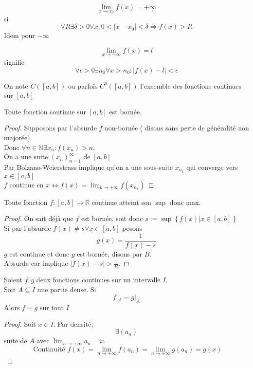 \documentclass[../main.tex]{subfiles}
\begin{document}
\begin{defn}[Notation]
	\[ 
		\lim_{x \to x_0} f(x) = + \infty
	\]
	si
	\[ 
		\forall R \exists \delta >0 \forall x : 0 <|x-x_0| < \delta \Rightarrow f(x) >R	
	\]
	Idem pour $- \infty$

\end{defn}

\begin{defn}[Notation]
\[ 
	\lim_{x \to  + \infty} f(x) = l
\]
signifie
\[ 
	\forall \epsilon>0 \exists n_0 \forall x >n_0: |f(x)-l| < \epsilon
\]

\end{defn}
On note $C( [ a,b])$ ou parfois $C^{0}( [ a,b])$ l'ensemble des fonctions continues sur $[a,b]$

\begin{thm}
	Toute fonction continue sur $[a,b]$ est bornée.
\end{thm}
\begin{proof}
	Supposons par l'absurde $f$ non-bornée ( disons sans perte de généralité non majorée). \\
	Donc $\forall n \in \mathbb{N} \exists x_n: f(x_n) >n$.\\
	On a une suite $(x_n)_{n=1} ^{ \infty}$ de $[a,b]$\\
	Par Bolzano-Weierstrass implique qu'on a une sous-suite  $x_{n_k}$ qui converge vers $x\in [ a,b]$ \\
	$f$ continue en $x \iff f(x) = \lim_{k \to  + \infty} f(x_{ n_k })$
\end{proof}
\begin{thm}
Toute fonction $f: [ a,b] \to \mathbb{R}$ continue atteint son $\sup$ donc max.
\end{thm}
\begin{proof}
	On sait déjà que $f$ est bornée, soit donc $s:= \sup \left\{ f(x) | x\in [ a,b] \right\} $ \\
	Si par l'absurde $f(x) \neq s \forall x \in [ a,b]$ posons
	\[ 
		g(x) = \frac{1}{f(x) -s}
	\]
	$g$ est continue et donc $g$ est bornée, disons par $B$.\\
	Absurde car implique $|f(x)-s| > \frac{1}{B}$.
\end{proof}

\begin{propo}
Soient $f,g$ deux fonctions continues sur un intervalle $I$.\\
Soit $A\subseteq I$ une partie dense. Si
\[ 
f|_A = g|_A
\]
Alors $f=g$ sur tout $I$
\end{propo}
\begin{proof}
Soit $x\in I$. Par densité,
\[ 
	\exists ( a_n)
\]
suite de $A$ avec $\lim_{n \to  + \infty} a_n=x$.\\
\[ 
	\text{ Continuité } f(x) = \lim_{n \to  + \infty} f(a_n) = \lim_{n \to  + \infty} g(a_n) = g(x)
\]

\end{proof}
	





	
\end{document}
